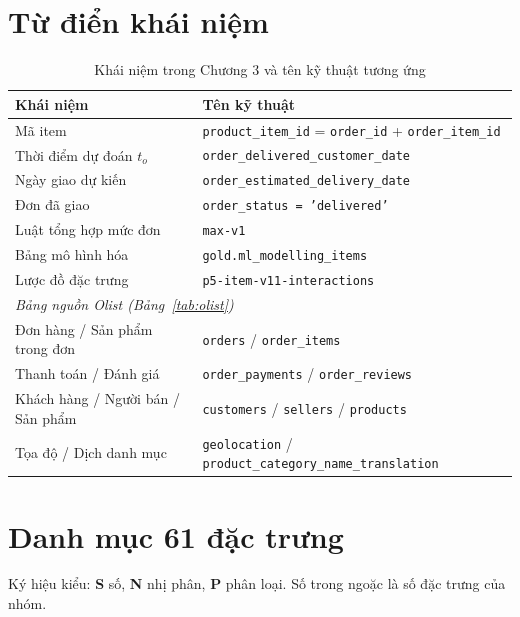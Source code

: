 \documentclass[12pt,a4paper]{report}
\begin{document}
\section{Từ điển khái niệm}\label{app:ids}
\begin{table}[htbp]\centering\small
\caption{Khái niệm trong Chương 3 và tên kỹ thuật tương ứng}\label{tab:app-dict}
\begin{tabular}{p{4.6cm}p{9.2cm}}
\toprule
Khái niệm & Tên kỹ thuật \\
\midrule
Mã item         & \texttt{product\_item\_id} = \texttt{order\_id} + \texttt{order\_item\_id} \\
Thời điểm dự đoán $t_o$ & \texttt{order\_delivered\_customer\_date} \\
Ngày giao dự kiến & \texttt{order\_estimated\_delivery\_date} \\
Đơn đã giao     & \texttt{order\_status = 'delivered'} \\
Luật tổng hợp mức đơn & \texttt{max-v1} \\
Bảng mô hình hóa & \texttt{gold.ml\_modelling\_items} \\
Lược đồ đặc trưng & \texttt{p5-item-v11-interactions} \\
\midrule
\multicolumn{2}{l}{\emph{Bảng nguồn Olist (Bảng~\ref{tab:olist})}} \\
Đơn hàng / Sản phẩm trong đơn & \texttt{orders} / \texttt{order\_items} \\
Thanh toán / Đánh giá & \texttt{order\_payments} / \texttt{order\_reviews} \\
Khách hàng / Người bán / Sản phẩm & \texttt{customers} / \texttt{sellers} / \texttt{products} \\
Tọa độ / Dịch danh mục & \texttt{geolocation} / \texttt{product\_category\_name\_translation} \\
\bottomrule
\end{tabular}
\end{table}

\section{Danh mục 61 đặc trưng}\label{app:features}
Ký hiệu kiểu: \textbf{S} số, \textbf{N} nhị phân, \textbf{P} phân loại. Số trong ngoặc là số đặc trưng của nhóm.
\end{document}
